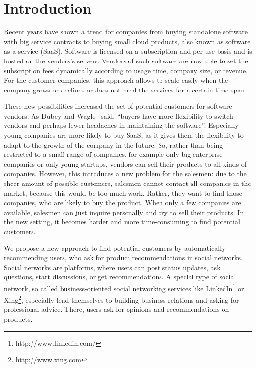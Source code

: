 

\section{Introduction}
\label{sec:introduction}

Recent years have shown a trend for companies from buying standalone software with big service contracts to buying small cloud products, also known as software as a service (SaaS).
Software is licensed on a subscription and per-use basis and is hosted on the vendors's servers.
Vendors of such software are now able to set the subscription fees dynamically according to usage time, company size, or revenue.
For the customer companies, this approach allows to scale easily when the company grows or declines or does not need the services for a certain time span.

These new possibilities increased the set of potential customers for software vendors.
As Dubey and Wagle~\cite{dubey2007delivering} said, ``buyers have more flexibility to switch vendors and perhaps fewer headaches in maintaining the software''.
Especially young companies are more likely to buy SaaS, as it gives them the flexibility to adapt to the growth of the company in the future.
So, rather than being restricted to a small range of companies, for example only big enterprise companies or only young startups, vendors can sell their products to all kinds of companies.
However, this introduces a new problem for the salesmen: due to the sheer amount of possible customers, salesmen cannot contact all companies in the market, because this would be too much work.
Rather, they want to find those companies, who are likely to buy the product.
When only a few companies are available, salesmen can just inquire personally and try to sell their products.
In the new setting, it becomes harder and more time-consuming to find potential customers.

We propose a new approach to find potential customers by automatically recommending users, who ask for product recommendations in social networks.
Social networks are platforms, where users can post status updates, ask questions, start discussions, or get recommendations.
A special type of social network, so called business-oriented social networking services like LinkedIn\footnote{http://www.linkedin.com/} or Xing\footnote{http://www.xing.com}, especially lend themselves to building business relations and asking for professional advice.
There, users ask for opinions and recommendations on products.

